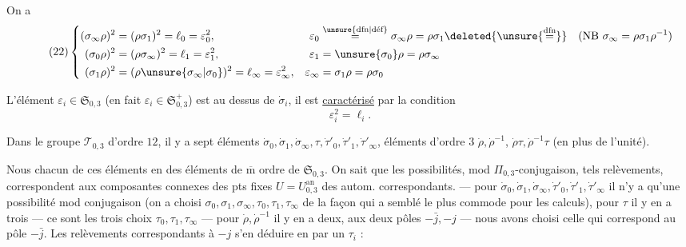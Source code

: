 

On a
\[
\tag{22}
\left\{\begin{aligned}
(\sigma_\infty\rho)^2&=(\rho\sigma_1)^2=\ell_0=\varepsilon_0^2,&
\varepsilon_0&\overset{\unsure{\text{dfn}|\text{déf}}}{=}\sigma_\infty\rho=\rho\sigma_1\deleted{\unsure{\overset{\mathrm{dfn}}{=}}}
\quad(\mathrm{NB}\ \sigma_\infty=\rho\sigma_1\rho^{-1})\\
(\sigma_0\rho)^2&=(\rho\sigma_\infty)^2=\ell_1=\varepsilon_1^2,&
\varepsilon_1&=\unsure{\sigma_0}\rho=\rho\sigma_\infty\\
(\sigma_1\rho)^2&=(\rho\unsure{\sigma_\infty|\sigma_0})^2=\ell_\infty=\varepsilon_\infty^2,&
\varepsilon_\infty&=\sigma_1\rho=\rho\sigma_0
\end{aligned}\right.
\]

L'élément $\varepsilon_i\in\mathfrak S_{0,3}$
(en fait $\varepsilon_i\in\mathfrak S_{0,3}^{+}$) est au dessus de $\dot\sigma_i$,
il est \uline{caractérisé} par la condition
\[
\varepsilon_i^2=\ell_i.
\]

Dans le groupe $\mathcal T_{0,3}$ d'ordre $12$, il y a sept éléments 
$\dot\sigma_0,\dot\sigma_1,\dot\sigma_\infty,\tau,\dot\tau'_0,\dot\tau'_1,\dot\tau'_\infty$,
  éléments d'ordre $3$
$\dot\rho,\dot\rho^{-1}$, 
$\dot\rho\tau,\dot\rho^{-1}\tau$ (en plus de l'unité).

Nous   chacun de ces éléments en des éléments de $\overline{\mathrm m}$ ordre de
$\mathfrak S_{0,3}$.
On sait que les possibilités, mod $\Pi_{0,3}$-conjugaison,  tels relèvements,
correspondent aux composantes connexes des pts fixes  $U=U_{0,3}^{\mathrm{an}}$
des autom.  correspondants. --- pour
$\dot\sigma_0,\dot\sigma_1,\dot\sigma_\infty,\dot\tau'_0,\dot\tau'_1,\dot\tau'_\infty$
il n'y a qu'une possibilité mod conjugaison (on a choisi
$\sigma_0,\sigma_1,\sigma_\infty,\tau_0,\tau_1,\tau_\infty$
de la façon qui a semblé le plus commode pour les calculs),
pour $\tau$ il y en a trois --- ce sont les trois choix $\tau_0,\tau_1,\tau_\infty$
--- pour $\dot\rho,\dot\rho^{-1}$ il y en a deux,
 aux deux pôles $-\bar j,-j$ --- nous avons choisi celle qui
correspond au pôle $-\bar j$.
Les relèvements correspondants à $-j$  s'en déduire en  par un $\tau_i$ :

